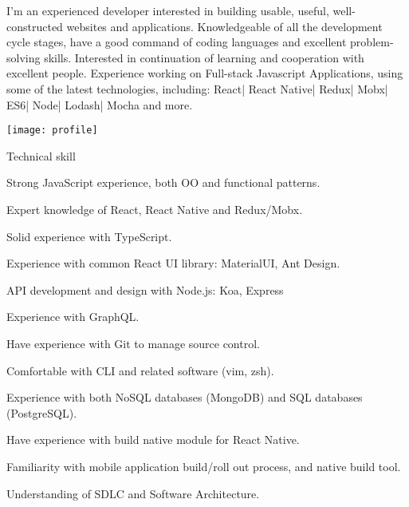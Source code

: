 \documentclass{resume}
\begin{document}

  \noindent\begin{minipage}{0.8\textwidth}%
    I'm an experienced developer interested in building usable, useful, well-constructed websites and applications. 
    Knowledgeable of all the development cycle stages, have a good command of coding languages and excellent problem-solving skills.
    Interested in continuation of learning and cooperation with excellent people.
    Experience working on Full-stack Javascript Applications, using some of the latest technologies, including:
    React| React Native| Redux| Mobx| ES6| Node| Lodash| Mocha and more.
    \end{minipage}%
    \hfill%
    \begin{minipage}{0.1\textwidth}\raggedright
      \texttt{[image: profile]}
    \end{minipage}

  \begin{rSection}{Technical skill}
    \begin{rSubsection}{}{}{}{}
      \item Strong JavaScript experience, both OO and functional patterns.
      \item Expert knowledge of React, React Native and Redux/Mobx.
      \item Solid experience with TypeScript.
      \item Experience with common React UI library: MaterialUI, Ant Design.
      \item API development and design with Node.js: Koa, Express
      \item Experience with GraphQL.
      \item Have experience with Git to manage source control.
      \item Comfortable with CLI and related software (vim, zsh).
      \item Experience with both NoSQL databases (MongoDB) and SQL databases (PostgreSQL).
      \item Have experience with build native module for React Native.
      \item Familiarity with mobile application build/roll out process, and native build tool.
      \item Understanding of SDLC and Software Architecture.
    \end{rSubsection}
  \end{rSection}
  
\end{document}
